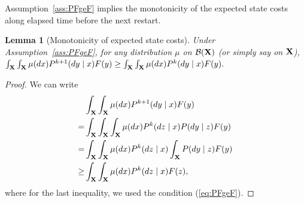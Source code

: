 \documentclass[letterpaper,10pt,conference]{ieeeconf}  %
\newtheorem{lemma}{Lemma}
\def\EE{\mathsf{E}}
\let\cal\mathcal
\begin{document}
Assumption~\ref{ass:PFgeF} implies the monotonicity of the expected state costs
along elapsed time before the next restart.

\medskip
\begin{lemma}[Monotonicity of expected state costs]
\label{lem:PkF_increasing}
Under Assumption~\ref{ass:PFgeF}, for any distribution {$\mu$ on ${\cal B}({\bf X})$ (or simply say on ${\bf X}$)}, 
{ $\int_{\bf X} \int_{\bf X} \mu(dx) P^{k+1}(dy \mid x) F(y)\ge\int_{\bf X} \int_{\bf X} {\mu(dx)} P^{k}(dy \mid x) F(y).$}

\end{lemma}
\medskip
\begin{proof}
We can write
\begin{align*}
&\int_{\bf X} \int_{\bf X} {\mu}(dx) P^{k+1}(dy \mid x) F(y)\\
=&
\int_{\bf X} \int_{\bf X} \int_{\bf X} {\mu}(dx) P^{k}(dz \mid x) P(dy \mid z) F(y)\\
=&
\int_{\bf X} \int_{\bf X} {\mu}(dx) P^{k}(dz \mid x) \int_{\bf X} P(dy \mid z) F(y)\\
\ge& \int_{\bf X} \int_{\bf X} {\mu}(dx) P^{k}(dz \mid x) F(z), 
\end{align*}
where for the last inequality, we used the condition (\ref{eq:PFgeF}).
\end{proof}
\end{document}
